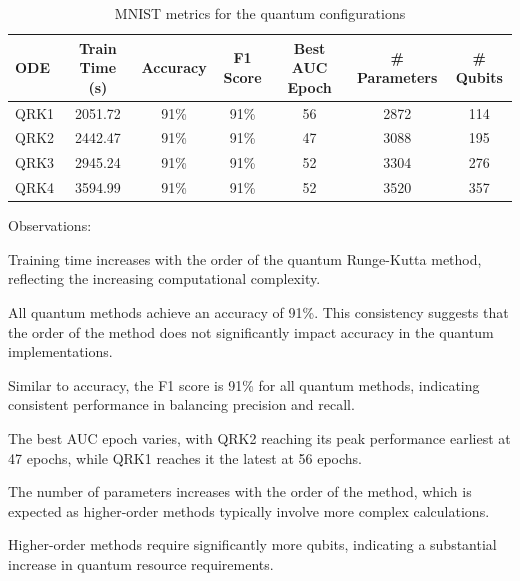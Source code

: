 \documentclass[12pt,a4paper]{report}
\begin{document}
\begin{table}[th]\small\linespread{1}
  \label{tab:classical_MNIST_3}
  \centering
  \begin{tabular}{|l|c|c|c|c|c|c|}
    \hline
    \textbf{ODE} & \textbf{Train Time (s)} & \textbf{Accuracy} & \textbf{F1 Score} & \textbf{Best AUC Epoch} & \textbf{\# Parameters} & \textbf{\# Qubits} \\
    \hline
    QRK1         & 2051.72                 & 91\%              & 91\%              & 56                      & 2872                   & 114                \\
    QRK2         & 2442.47                 & 91\%              & 91\%              & 47                      & 3088                   & 195                \\
    QRK3         & 2945.24                 & 91\%              & 91\%              & 52                      & 3304                   & 276                \\
    QRK4         & 3594.99                 & 91\%              & 91\%              & 52                      & 3520                   & 357                \\
    \hline
  \end{tabular}
  \caption{MNIST metrics for the quantum configurations}
\end{table}

Observations:

Training time increases with the order of the quantum Runge-Kutta method, reflecting the increasing computational complexity.

All quantum methods achieve an accuracy of 91\%. This consistency suggests that the order of the method does not significantly impact accuracy in the quantum implementations.

Similar to accuracy, the F1 score is 91\% for all quantum methods, indicating consistent performance in balancing precision and recall.

The best AUC epoch varies, with QRK2 reaching its peak performance earliest at 47 epochs, while QRK1 reaches it the latest at 56 epochs.

The number of parameters increases with the order of the method, which is expected as higher-order methods typically involve more complex calculations.

Higher-order methods require significantly more qubits, indicating a substantial increase in quantum resource requirements.

\clearpage
\end{document}
